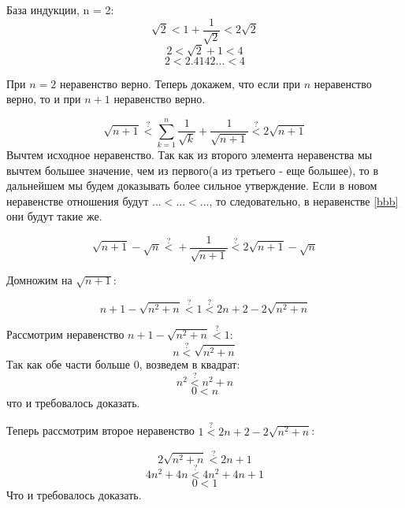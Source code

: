 \documentclass[a4paper]{article}
\begin{document}
База индукции, n = 2:
$$ \sqrt{2} < 1 + \frac{1}{\sqrt{2}} < 2 \sqrt{2}$$
$$ 2 < \sqrt{2} + 1 < 4 $$
$$ 2 < 2.4142... < 4 $$

При $n = 2$ неравенство верно. Теперь докажем, что если при $n$ неравенство верно, то и при $n+ 1$ неравенство верно.

\begin{equation}\label{bbb}
\sqrt{n + 1} \overset{?}{<} \sum_{k=1}^n\frac{1}{\sqrt{k}} + \frac{1}{\sqrt{n+1}} \overset{?}{<} 2 \sqrt{n+1}
\end{equation}
Вычтем исходное неравенство. Так как из второго элемента неравенства мы вычтем большее значение, чем из первого(а из третьего - еще большее), то в дальнейшем мы будем доказывать более сильное утверждение. Если в новом неравенстве отношения будут $... < ... < ...$, то следовательно, в неравенстве \eqref{bbb} они будут такие же.

\begin{equation}
\sqrt{n + 1} - \sqrt{n } \overset{?}{<} + \frac{1}{\sqrt{n+1}} \overset{?}{<} 2 \sqrt{n+1} - \sqrt{n }
\end{equation}

Домножим на $\sqrt{n+1}$:

\begin{equation}
n + 1 - \sqrt{n^2 + n } \overset{?}{<} 1 \overset{?}{<} 2n + 2 - 2\sqrt{n^2 + n }
\end{equation}


Рассмотрим неравенство $n + 1 - \sqrt{n^2 + n } \overset{?}{<} 1$:
$$n  \overset{?}{<} \sqrt{n^2 + n }$$
Так как обе части больше 0, возведем в квадрат:
$$n^2  \overset{?}{<} n^2 + n $$
$$0  < n $$
что и требовалось доказать.

Теперь рассмотрим второе неравенство $ 1 \overset{?}{<} 2n + 2 - 2\sqrt{n^2 + n }$:

$$2\sqrt{n^2 + n }   \overset{?}{<} 2n + 1  $$
$$4n^2 + 4n    \overset{?}{<} 4n^2 + 4n + 1  $$
$$0   < 1  $$
Что и требовалось доказать.
\end{document}
